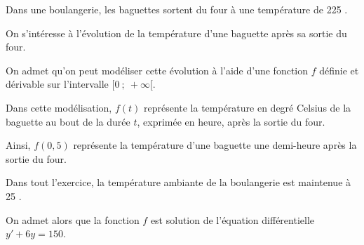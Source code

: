 \medskip


\medskip

Dans une boulangerie, les baguettes sortent du four à une température de 225 \textcelsius.

On s'intéresse à l'évolution de la température d'une baguette après sa sortie du four.

On admet qu'on peut modéliser cette évolution à l'aide d'une fonction $f$ définie et dérivable sur l'intervalle $[0~;~+\infty[$.

 Dans cette modélisation, $f(t)$ représente la température en degré Celsius de la baguette au bout de la durée $t$, exprimée en heure, après la sortie du four.
 
Ainsi, $f(0,5)$ représente la température d'une baguette une demi-heure après la sortie du four.

Dans tout l'exercice, la température ambiante de la boulangerie est maintenue à 25 \textcelsius.

On admet alors que la fonction $f$ est solution de l'équation différentielle $y'+ 6y = 150$.

\medskip

